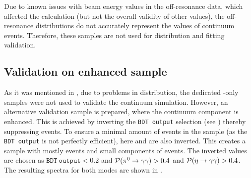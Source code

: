 Due to known issues with beam energy values in the off-resonance data, which affected the \Mbc calculation (but not the overall validity of other values), 
the \epem\ra\qqbar off-resonance \Mbc distributions do not accurately represent the \Mbc values of continuum events.
Therefore, these samples are not used for \Mbc distribution and \Mbc fitting validation.

\subsection{Validation on \texorpdfstring{\epem\ra\qqbar}{e+e- -> qqbar} enhanced sample}\label{sec:continuum_mbc_validation}

As it was mentioned in , due to problems in \Mbc distribution, 
the dedicated \epem\ra\qqbar-only samples were not used to validate the continuum simulation.
However, an alternative validation sample is prepared, where the continuum component is enhanced.
This is achieved by inverting the \texttt{BDT~output} selection (see ) thereby suppressing \BB events.
To ensure a minimal amount of \BtoXsgamma events in the sample (as the \texttt{BDT~output} is not perfectly efficient), here \piVeto and \etaVeto
are also inverted.
This creates a sample with mostly \epem\ra\qqbar events and small components of \BB events.
The inverted values are chosen as $\mathtt{BDT~output}<0.2$ and ${\mathcal{P}(\pi^0\rightarrow\gamma\gamma)}>0.4$ and ${\mathcal{P}(\eta\rightarrow\gamma\gamma)}>0.4$.
The resulting \EB spectra for both \FEI modes are shown in .
